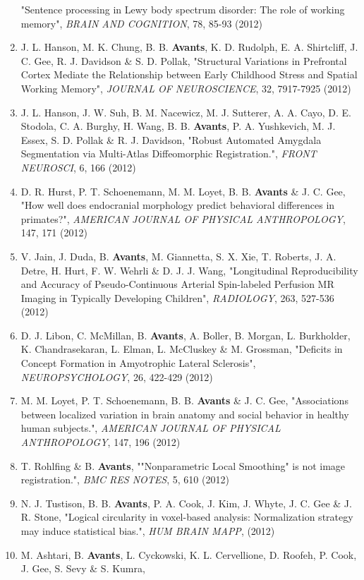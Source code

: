 \documentclass[11pt]{moderncv} %
\begin{document}
\begin{enumerate}
"Sentence processing in Lewy body spectrum disorder: The role of working memory", 
{\em BRAIN AND COGNITION}, 78, 85-93 (2012)
\item J. L. Hanson, M. K. Chung, B. B. \textbf{Avants}, K. D. Rudolph, E. A. Shirtcliff, J. C. Gee, R. J. Davidson \&  S. D. Pollak, 
"Structural Variations in Prefrontal Cortex Mediate the Relationship between Early Childhood Stress and Spatial Working Memory", 
{\em JOURNAL OF NEUROSCIENCE}, 32, 7917-7925 (2012)
\item J. L. Hanson, J. W. Suh, B. M. Nacewicz, M. J. Sutterer, A. A. Cayo, D. E. Stodola, C. A. Burghy, H. Wang, B. B. \textbf{Avants}, P. A. Yushkevich, M. J. Essex, S. D. Pollak \&  R. J. Davidson, 
"Robust Automated Amygdala Segmentation via Multi-Atlas Diffeomorphic Registration.", 
{\em FRONT NEUROSCI}, 6, 166 (2012)
\item D. R. Hurst, P. T. Schoenemann, M. M. Loyet, B. B. \textbf{Avants} \&  J. C. Gee, 
"How well does endocranial morphology predict behavioral differences in primates?", 
{\em AMERICAN JOURNAL OF PHYSICAL ANTHROPOLOGY}, 147, 171 (2012)
\item V. Jain, J. Duda, B. \textbf{Avants}, M. Giannetta, S. X. Xie, T. Roberts, J. A. Detre, H. Hurt, F. W. Wehrli \&  D. J. J. Wang, 
"Longitudinal Reproducibility and Accuracy of Pseudo-Continuous Arterial Spin-labeled Perfusion MR Imaging in Typically Developing Children", 
{\em RADIOLOGY}, 263, 527-536 (2012)
\item D. J. Libon, C. McMillan, B. \textbf{Avants}, A. Boller, B. Morgan, L. Burkholder, K. Chandrasekaran, L. Elman, L. McCluskey \&  M. Grossman, 
"Deficits in Concept Formation in Amyotrophic Lateral Sclerosis", 
{\em NEUROPSYCHOLOGY}, 26, 422-429 (2012)
\item M. M. Loyet, P. T. Schoenemann, B. B. \textbf{Avants} \&  J. C. Gee, 
"Associations between localized variation in brain anatomy and social behavior in healthy human subjects.", 
{\em AMERICAN JOURNAL OF PHYSICAL ANTHROPOLOGY}, 147, 196 (2012)
\item T. Rohlfing \&  B. \textbf{Avants}, 
""Nonparametric Local Smoothing" is not image registration.", 
{\em BMC RES NOTES}, 5, 610 (2012)
\item N. J. Tustison, B. B. \textbf{Avants}, P. A. Cook, J. Kim, J. Whyte, J. C. Gee \&  J. R. Stone, 
"Logical circularity in voxel-based analysis: Normalization strategy may induce statistical bias.", 
{\em HUM BRAIN MAPP}, (2012)
\item M. Ashtari, B. \textbf{Avants}, L. Cyckowski, K. L. Cervellione, D. Roofeh, P. Cook, J. Gee, S. Sevy \&  S. Kumra, 

\end{enumerate}
\end{document}
